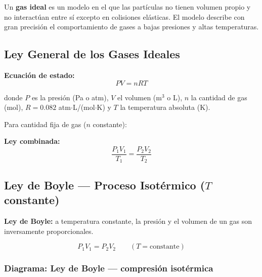\begin{seccion}
Un \textbf{gas ideal} es un modelo en el que las partículas no tienen volumen propio y no interactúan entre sí excepto en colisiones elásticas. El modelo describe con gran precisión el comportamiento de gases a bajas presiones y altas temperaturas.
\end{seccion}

\subsection{Ley General de los Gases Ideales}

\begin{seccion}
\begin{ecuacion}
\textbf{Ecuación de estado:}
$$PV = nRT$$

donde $P$ es la presión (Pa o atm), $V$ el volumen (m$^3$ o L), $n$ la cantidad de gas (mol), $R = 0.082$ atm$\cdot$L/(mol$\cdot$K) y $T$ la temperatura absoluta (K).
\end{ecuacion}

Para cantidad fija de gas ($n$ constante):

\begin{ecuacion}
\textbf{Ley combinada:}
$$\frac{P_1 V_1}{T_1} = \frac{P_2 V_2}{T_2}$$
\end{ecuacion}
\end{seccion}

\subsection{Ley de Boyle --- Proceso Isotérmico ($T$ constante)}

\begin{seccion}
\begin{definicion}
\textbf{Ley de Boyle:} a temperatura constante, la presión y el volumen de un gas son inversamente proporcionales.
\end{definicion}

\begin{ecuacion}
$$P_1 V_1 = P_2 V_2 \qquad (T = \text{constante})$$
\end{ecuacion}
\end{seccion}

\subsubsection{Diagrama: Ley de Boyle --- compresión isotérmica}

